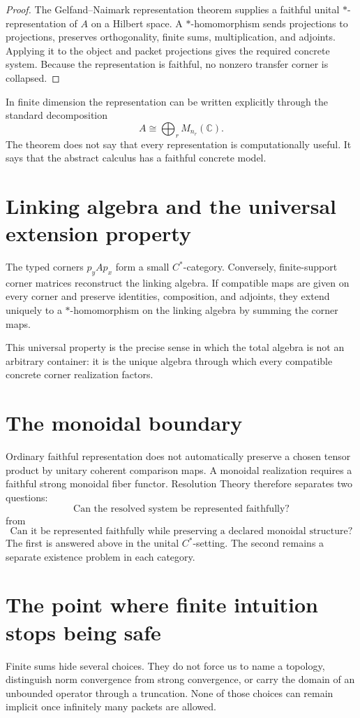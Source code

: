 \documentclass[11pt,oneside]{book}
\theoremstyle{remark}
\begin{document}
\begin{proof}
The Gelfand--Naimark representation theorem supplies a faithful unital \(*\)-representation of \(A\) on a Hilbert space.  A \(*\)-homomorphism sends projections to projections, preserves orthogonality, finite sums, multiplication, and adjoints.  Applying it to the object and packet projections gives the required concrete system.  Because the representation is faithful, no nonzero transfer corner is collapsed.
\end{proof}

In finite dimension the representation can be written explicitly through the standard decomposition
\[
A\cong\bigoplus_rM_{n_r}(\mathbb C).
\]
The theorem does not say that every representation is computationally useful.  It says that the abstract calculus has a faithful concrete model.

\section{Linking algebra and the universal extension property}
The typed corners \(p_yAp_x\) form a small \(C^*\)-category.  Conversely, finite-support corner matrices reconstruct the linking algebra.  If compatible maps are given on every corner and preserve identities, composition, and adjoints, they extend uniquely to a \(*\)-homomorphism on the linking algebra by summing the corner maps.

This universal property is the precise sense in which the total algebra is not an arbitrary container: it is the unique algebra through which every compatible concrete corner realization factors.

\section{The monoidal boundary}
Ordinary faithful representation does not automatically preserve a chosen tensor product by unitary coherent comparison maps.  A monoidal realization requires a faithful strong monoidal fiber functor.  Resolution Theory therefore separates two questions:
\[
\boxed{
\text{Can the resolved system be represented faithfully?}
}
\]
from
\[
\boxed{
\text{Can it be represented faithfully while preserving a declared monoidal structure?}
}
\]
The first is answered above in the unital \(C^*\)-setting.  The second remains a separate existence problem in each category.

\section*{The point where finite intuition stops being safe}
Finite sums hide several choices.  They do not force us to name a topology, distinguish norm convergence from strong convergence, or carry the domain of an unbounded operator through a truncation.  None of those choices can remain implicit once infinitely many packets are allowed.
\end{document}
